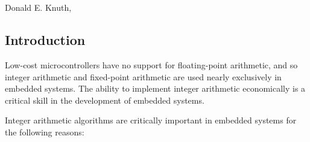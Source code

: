 
\chapter[\ccilzeroshorttitle{}]{\ccilzerolongtitle{}}

\label{ccil0}

                     {Donald E. Knuth, \cite[p. 319]{bibref:b:knuthclassic2ndedvol2}}

\section{Introduction}
\label{ccil0:sint0}

Low-cost microcontrollers have no support for floating-point arithmetic,
and so integer arithmetic and fixed-point arithmetic are used nearly exclusively
in embedded systems.  The ability to implement integer arithmetic
economically is a critical skill in the development of embedded
systems.

Integer arithmetic algorithms are critically important in embedded
systems for the following reasons:

